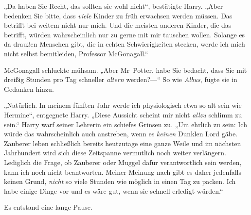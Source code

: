 „Da haben Sie Recht, das sollten sie wohl nicht“, bestätigte Harry. „Aber bedenken Sie bitte, dass \emph{viele} Kinder zu früh erwachsen werden müssen. Das betrifft bei weitem nicht nur mich. Und die meisten anderen Kinder, die das betrifft, würden wahrscheinlich nur zu gerne mit mir tauschen wollen. Solange es da draußen Menschen gibt, die in echten Schwierigkeiten stecken, werde ich mich nicht selbst bemitleiden, Professor McGonagall.“

McGonagall schluckte mühsam. „Aber Mr~Potter, habe Sie bedacht, dass Sie mit dreißig Stunden pro Tag schneller \emph{altern} werden?—“ So wie \emph{Albus}, fügte sie in Gedanken hinzu.

„Natürlich. In meinem fünften Jahr werde ich physiologisch etwa so alt sein wie Hermine“, entgegnete Harry. „Diese Aussicht scheint mir nicht \emph{allzu} schlimm zu sein.“ Harry warf seiner Lehrerin ein schiefes Grinsen zu. „Um ehrlich zu sein: Ich würde das wahrscheinlich auch anstreben, wenn es \emph{keinen} Dunklen Lord gäbe. Zauberer leben schließlich bereits heutzutage eine ganze Weile und im nächsten Jahrhundert wird sich diese Zeitspanne vermutlich noch weiter verlängern. Lediglich die Frage, ob Zauberer oder Muggel dafür verantwortlich sein werden, kann ich noch nicht beantworten. Meiner Meinung nach gibt es daher jedenfalls keinen Grund, \emph{nicht} so viele Stunden wie möglich in einen Tag zu packen. Ich habe einige Dinge vor und es wäre gut, wenn sie schnell erledigt würden.“

Es entstand eine lange Pause.

